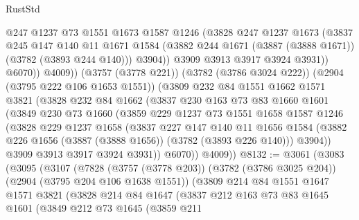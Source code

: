 \begin{lexlean}{RustStd}
\begin{coremodule}
                  @247
                  @1237
                  @73
                  @1551
                  @1673
                  @1587
                  @1246
                  (@3828
                    @247
                    @1237
                    @1673
                    (@3837
                      @245
                      @147
                      @140
                      @11
                      @1671
                      @1584
                      (@3882 @244 @1671 (@3887 (@3888 @1671)) (@3782 (@3893 @244 @140)))
                      @3904))
                  @3909
                  @3913
                  @3917
                  @3924
                  @3931))
              @6070))
          @4009))
      (@3757 (@3778 @221))
      (@3782 (@3786 @3024 @222))
      (@2904 (@3795 @222 @106 @1653 @1551))
      (@3809
        @232
        @84
        @1551
        @1662
        @1571
        @3821
        (@3828
          @232
          @84
          @1662
          (@3837
            @230
            @163
            @73
            @83
            @1660
            @1601
            (@3849
              @230
              @73
              @1660
              (@3859
                @229
                @1237
                @73
                @1551
                @1658
                @1587
                @1246
                (@3828
                  @229
                  @1237
                  @1658
                  (@3837
                    @227
                    @147
                    @140
                    @11
                    @1656
                    @1584
                    (@3882 @226 @1656 (@3887 (@3888 @1656)) (@3782 (@3893 @226 @140)))
                    @3904))
                @3909
                @3913
                @3917
                @3924
                @3931))
            @6070))
        @4009))
@8132 := @3061
    (@3083
      (@3095
        (@3107
          (@7828
            (@3757 (@3778 @203))
            (@3782 (@3786 @3025 @204))
            (@2904 (@3795 @204 @106 @1638 @1551))
            (@3809
              @214
              @84
              @1551
              @1647
              @1571
              @3821
              (@3828
                @214
                @84
                @1647
                (@3837
                  @212
                  @163
                  @73
                  @83
                  @1645
                  @1601
                  (@3849
                    @212
                    @73
                    @1645
                    (@3859
                      @211

\end{coremodule}
\end{lexlean}
